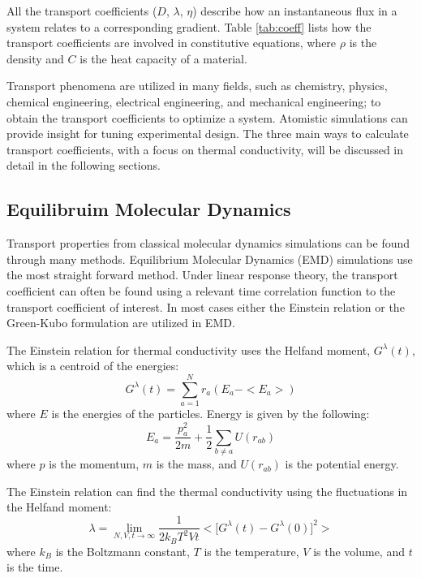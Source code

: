 All the transport coefficients ($D$, $\lambda$, $\eta$) describe how an instantaneous flux in a system relates to a corresponding gradient. Table \ref{tab:coeff} lists how the transport coefficients are involved in constitutive equations, where $\rho$ is the density and $C$ is the heat capacity of a material.

Transport phenomena are utilized in many fields, such as chemistry, physics, chemical engineering, electrical engineering, and mechanical engineering; to obtain the transport coefficients to optimize a system. Atomistic simulations can provide insight for tuning experimental design. The three main ways to calculate transport coefficients, with a focus on thermal conductivity, will be discussed in detail in the following sections.

\subsection{Equilibruim Molecular Dynamics}
Transport properties from classical molecular dynamics simulations can be found through many methods. Equilibrium Molecular Dynamics (EMD) simulations use the most straight forward method. Under linear response theory, the transport coefficient can often be found using a relevant time correlation function to the transport coefficient of interest.\cite{Heyes:1988ee,MASSOBRIO:1984bl,Helfand:1960os,Viscardy:2007rp,che:6888,kinaci:014106} In most cases either the Einstein relation or the Green-Kubo formulation are utilized in EMD.

The Einstein relation for thermal conductivity uses the Helfand moment, $G^\lambda (t)$, which is a centroid of the energies:
\begin{equation}
    G^\lambda (t) = \sum^{N}_{a=1} r_a (E_a - <E_a>)
\end{equation}
where $E$ is the energies of the particles. Energy is given by the following: 
\begin{equation}
    E_a = \frac{p_a^2}{2m} + \frac{1}{2}\sum_{b\neq a} U(r_{ab})
\end{equation}
where $p$ is the momentum, $m$ is the mass, and $U(r_{ab})$ is the potential energy.

The Einstein relation can  find the thermal conductivity using the fluctuations in the Helfand moment:
\begin{equation}
    \lambda = \lim_{N,V,t \rightarrow \infty} \frac{1}{2k_B T^2 Vt} \bigg< \Big[ G^\lambda (t) - G^\lambda (0) \Big]^2\bigg>
\end{equation}
where $k_B$ is the Boltzmann constant, $T$ is the temperature, $V$ is the volume, and $t$ is the time.

